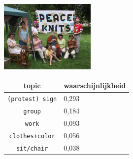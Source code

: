 \begin{figure}
\begin{subfigure}{\textwidth}
    \centering
    \begin{minipage}[t][3.5cm]{.5\linewidth}
    \centering
    \vspace{0pt}
    \includegraphics[height=3.5cm]{Images/LDA/4386588.jpg}
    \end{minipage}\hfill
    \begin{minipage}[t][3.5cm]{.5\textwidth}
    \centering
    \vspace{0pt}
    \begin{tabularx}{\textwidth}{cl}
            topic                           & waarschijnlijkheid\\
            \hline
            \texttt{(protest) sign} & 0,293\\
            \texttt{group} & 0,184\\
            \texttt{work} & 0,093\\
            \texttt{clothes+color} & 0,056\\
            \texttt{sit/chair} & 0,038\\
            \hline
        \end{tabularx}
    \end{minipage}
\end{subfigure}

\vspace*{4mm}


\end{figure}
